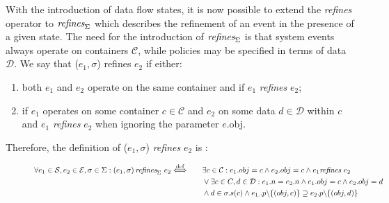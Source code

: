 With the introduction of data flow states, it is now possible to extend the \emph{refines} operator to $\emph{refines}_{\Sigma}$ which describes the refinement of an event in the presence of a given state. The need for the introduction of $\emph{refines}_{\Sigma}$ is that system events always operate on containers $\mathcal{C}$, while policies may be specified in terms of data $\mathcal{D}$. We say that ($e_1,\sigma$) refines $e_2$ if either:
\begin{enumerate}
    \item both $e_1$ and $e_2$ operate on the same container and if $e_1$ \emph{refines} $e_2$;
    \item if $e_1$ operates on some container $c \in \mathcal{C}$ and $e_2$ on some data $d \in \mathcal{D}$
    within $c$ and $e_1$ \emph{refines} $e_2$ when ignoring the parameter $e$.obj.
\end{enumerate}

Therefore, the definition of ($e_1,\sigma$) \emph{refines} $e_2$ is :

    \begin{figure}[htbp]
        \begin{adjustbox}{width=\textwidth}
        \begin{minipage}{\textwidth}
        \begin{alignat*}{3}
        \forall e_1 \in \mathcal{S}, e_2 \in \mathcal{E}, \sigma \in \Sigma: \left(e_1, \sigma\right) \emph{refines}_{\Sigma} \ e_2 & \overset{\text { def }}{\Longleftrightarrow} \quad && \exists c \in \mathcal{C}: e_1 . obj=c \wedge e_2 . obj=c \wedge e_1 \emph{refines} \ e_2 \\
        & \quad && \vee \exists c \in C, d \in \mathcal{D}: e_1 . n=e_2 . n \wedge e_1 . obj=c \wedge e_2 . obj=d \\
        & \quad && \wedge d \in \sigma . s(c) \wedge e_{1 .} . p \backslash\{(obj, c)\} \supseteq e_2 . p \backslash\{(obj, d)\}
        \end{alignat*}
        \end{minipage}
        \end{adjustbox}
        \end{figure}
        

